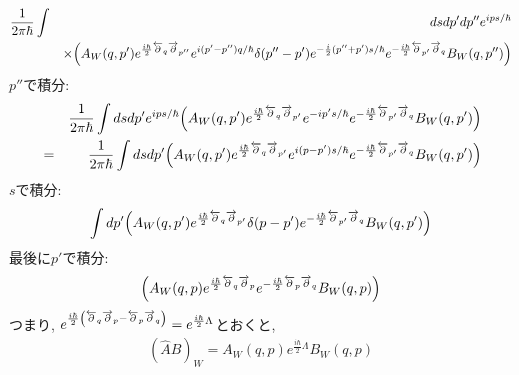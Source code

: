 \documentclass[10.5pt,a4paper]{jreport}
\begin{document}
\begin{eqnarray}
  \nonumber\frac{1}{2\pi\hbar}\int&& ds dp' dp'' e^{ips/\hbar}\\
  &&\times\qty(A_W\qty(q, p')e^{\frac{i\hbar}{2}\overleftarrow{\partial}_q\overrightarrow{\partial}_{p''}}e^{i(p'-p'')q/\hbar}\delta(p''-p')e^{-\frac{i}{2}(p''+p')s/\hbar}e^{-\frac{i\hbar}{2}\overleftarrow{\partial}_{p'}\overrightarrow{\partial}_{q}}B_W\qty(q, p''))
\end{eqnarray}
$p''$で積分:
\begin{eqnarray}
  &&\frac{1}{2\pi\hbar}\int ds dp' e^{ips/\hbar}\qty(A_W\qty(q, p')e^{\frac{i\hbar}{2}\overleftarrow{\partial}_q\overrightarrow{\partial}_{p'}}e^{-ip's/\hbar}e^{-\frac{i\hbar}{2}\overleftarrow{\partial}_{p'}\overrightarrow{\partial}_{q}}B_W\qty(q, p'))\\
  &=& \frac{1}{2\pi\hbar}\int ds dp' \qty(A_W\qty(q, p')e^{\frac{i\hbar}{2}\overleftarrow{\partial}_q\overrightarrow{\partial}_{p'}}e^{i(p-p')s/\hbar}e^{-\frac{i\hbar}{2}\overleftarrow{\partial}_{p'}\overrightarrow{\partial}_{q}}B_W\qty(q, p'))
\end{eqnarray}
$s$で積分:
\begin{eqnarray}
  \int dp' \qty(A_W\qty(q, p')e^{\frac{i\hbar}{2}\overleftarrow{\partial}_q\overrightarrow{\partial}_{p'}}\delta(p-p')e^{-\frac{i\hbar}{2}\overleftarrow{\partial}_{p'}\overrightarrow{\partial}_{q}}B_W\qty(q, p'))
\end{eqnarray}
最後に$p'$で積分:
\begin{eqnarray}
  \qty(A_W\qty(q, p)e^{\frac{i\hbar}{2}\overleftarrow{\partial}_q\overrightarrow{\partial}_{p}}e^{-\frac{i\hbar}{2}\overleftarrow{\partial}_{p}\overrightarrow{\partial}_{q}}B_W\qty(q, p))
\end{eqnarray}
つまり, $e^{\frac{i\hbar}{2}\qty(\overleftarrow{\partial}_q\overrightarrow{\partial}_{p}-\overleftarrow{\partial}_{p}\overrightarrow{\partial}_{q})} = e^{\frac{i\hbar}{2}\Lambda}$とおくと,
\begin{eqnarray}
  (\hat{A}\hat{B})_W = A_W(q, p)e^{\frac{i\hbar}{2}\Lambda}B_W(q, p)\label{wigner_end}
\end{eqnarray}
\end{document}
